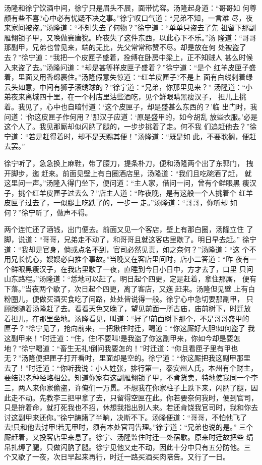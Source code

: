 汤隆和徐宁饮酒中间，徐宁只是眉头不展，面带忧容。汤隆起身道：“哥哥如
何尊颜有些不喜?心中必有忧疑不决之事。”徐宁叹口气道：“兄弟不知，一言难
尽，夜来家间被盗。”汤隆道：“不知失去了何物？”徐宁道：“单单只盗去了先
祖留下那副雁翎锁子甲，又唤做赛唐猊。昨夜失了这件东西，以此心下不乐。”汤
隆道：“哥哥那副甲，兄弟也曾见来，端的无比，先父常常称赞不尽。却是放在何
处被盗了去？”徐宁道：“我把一个皮匣子盛着，拴缚在卧房中梁上，正不知贼人
甚么时候入来盗了去。”汤隆问道：“却是甚等样皮匣子盛着？”徐宁道：“是个
红羊皮匣子盛着，里面又用香绵裹住。”汤隆假意失惊道：“红羊皮匣子?不是上
面有白线刺着绿云头如意，中间有狮子滚绣球的？”徐宁道：“兄弟，你那里见来？”
汤隆道：“小弟夜来离城四十里，在一个村店里沽些酒吃，见个鲜眼睛黑瘦汉子，
担儿上挑着。我见了，心中也自暗忖道：‘这个皮匣子，却是盛甚么东西的？’临
出门时，我问道：‘你这皮匣子作何用？’那汉子应道：‘原是盛甲的，如今胡乱
放些衣服。’必是这个人了。我见那厮却似闪肭了腿的，一步步挑着了走。何不我
们追赶他去？”徐宁道：“若是赶得着时，却不是天赐其便！”汤隆道：“既是如
此，不要耽搁，便赶去罢。”

徐宁听了，急急换上麻鞋，带了腰刀，提条朴刀，便和汤隆两个出了东郭门，
拽开脚步，迤赶来。前面见壁上有白圈酒店里，汤隆道：“我们且吃碗酒了赶，
就这里问一声。”汤隆入得门坐下，便问道：“主人家，借问一问，曾有个鲜眼黑
瘦汉子，挑个红羊皮匣子过去么？”店主人道：“昨夜晚，是有这般一个人挑着个
红羊皮匣子过去了，一似腿上吃跌了的，一步一走。”汤隆道：“哥哥，你听却
如何？”徐宁听了，做声不得。

两个连忙还了酒钱，出门便去。前面又见一个客店，壁上有那白圈，汤隆立住
了脚，说道：“哥哥，兄弟走不动了，和哥哥且就这客店里歇了。明日早去赶。”
徐宁道：“我却是官身，倘或点名不到，官司必然见责，如之奈何？”汤隆道：“这
个不用兄长忧心，嫂嫂必自推个事故。”当晚又在客店里问时，店小二答道：“昨
夜有一个鲜眼黑瘦汉子，在我店里歇了一夜，直睡到今日小日中，方才去了，口里
只问山东路程。”汤隆道：“恁地可以赶了。明日起个四更，定是赶着，拿住那厮，
便有下落。”当夜两个歇了，次日起个四更，离了客店，又迤赶来。汤隆但见壁
上有白粉圈儿，便做买酒买食吃了问路，处处皆说得一般。徐宁心中急切要那副甲，
只顾跟随着汤隆赶了去。看看天色又晚了，望见前面一所古庙，庙前树下，时迁放
着担儿，在那里坐地。汤隆看见，叫道：“好了!前面树下那个，不是哥哥盛甲的
匣子？”徐宁见了，抢向前来，一把揪住时迁，喝道：“你这厮好大胆!如何盗了
我这副甲来！”时迁道：“住，住!不要叫!是我盗了你这副甲来，你如今却是要怎
地？”徐宁喝道：“畜生无礼!倒问我要怎的！”时迁道：“你且看匣子里有甲也
无？”汤隆便把匣子打开看时，里面却是空的。徐宁道：“你这厮把我这副甲那里
去了！”时迁道：“你听我说：小人姓张，排行第一，泰安州人氏，本州有个财主，
要结识老种经略相公。知道你家有这副雁翎锁子甲，不肯货卖，特地使我同一个李
三，两人来你家偷盗，许俺们一万贯。不想我在你家柱子上跌下来，闪肭了腿，因
此走不动。先教李三把甲拿了去，只留得空匣在此。你若要奈何我时，便到官司，
只是拚着命，就打死我也不招，休想我指出别人来。若还肯饶我官司时，我和你去
讨这副甲来还你。”徐宁踌躇了半晌，决断不下。汤隆便道：“哥哥，不怕他飞了
去!只和他去讨甲!若无甲时，须有本处官司告理。”徐宁道：“兄弟也说的是。”
三个厮赶着，又投客店里来息了。徐宁、汤隆监住时迁一处宿歇。原来时迁故把些
绢帛扎缚了腿，只做闪肭了腿。徐宁见他又走不动，因此十分中只有五分防他。三
个又歇了一夜，次日早起来再行，时迁一路买酒买肉陪告。又行了一日。

